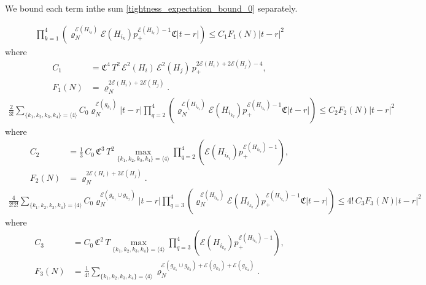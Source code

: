 \documentclass[11pt,reqno]{amsart}
\numberwithin{equation}{section}
\newcommand{\abs}[1]{\left\lvert #1 \right\rvert}
\newcommand{\sprod}[1]{\langle#1\rangle}
\begin{document}
{We bound  each term inthe sum \eqref{tightness_expectation_bound_0} separately. 


\begin{align}
    \prod_{k=1}^{4}\left(\varrho_N^{\mathcal{E}({H}_{i_k})}\mathcal{E}({H}_{i_k})p_+^{\mathcal{E}({H}_{i_k})-1}{\mathfrak{C}}\abs{t-r}\right)\leqslant C_1F_1(N)\abs{t-r}^2\label{CF_bound_1}
\end{align}
where
\begin{align*}
    C_1 &={\mathfrak{C}^4}\,T^2\,\mathcal{E}^2({H}_i)\,\mathcal{E}^{2}({H}_j)\,p_+^{2\mathcal{E}({H}_{i})+2\mathcal{E}({H}_j)-4},\\
    F_1(N) &=\varrho_N^{2\mathcal{E}({H_i})+2\mathcal{E}({H_j})}.
\end{align*}
\begin{align}
    \frac{2}{3!}\sum_{\{k_1,k_2,k_3,k_4\} = \sprod{4}} C_0\varrho_N^{\mathcal{E}(g_{k_1})}\abs{t-r}\prod_{q=2}^{4}\left(\varrho_N^{\mathcal{E}({H}_{i_{k_q}})}\mathcal{E}({H}_{i_{k_q}})p_+^{\mathcal{E}({H}_{i_{k_q}})-1}{\mathfrak{C}}\abs{t-r}\right) \leqslant C_2F_2(N)\abs{t-r}^2\label{CF_bound_2}
\end{align}
where
\begin{align*}
    C_2 &=\frac{1}{3}\,C_0\,{\mathfrak{C}^3}\,T^2\max_{\{k_1,k_2,k_3,k_4\} = \sprod{4}} \prod_{q=2}^{4}\left(\mathcal{E}({H}_{i_{k_q}})p_+^{\mathcal{E}({H}_{i_{k_q}})-1}\right),\\
    F_2(N) &=\varrho_N^{2\mathcal{E}({H_i})+2\mathcal{E}({H_j})}.
\end{align*}
\begin{align}
    \frac{4}{2!2!}\sum_{\{k_1,k_2,k_3,k_4\} = \sprod{4}} C_0\varrho_N^{\mathcal{E}(g_{k_1}\cup g_{k_2})}\abs{t-r}\prod_{q=3}^{4}\left(\varrho_N^{\mathcal{E}({H}_{i_{k_q}})}\mathcal{E}({H}_{i_{k_q}})p_+^{\mathcal{E}({H}_{i_{k_q}})-1}{\mathfrak{C}}\abs{t-r}\right)\leqslant 4!\,C_3F_3(N)\abs{t-r}^2\label{CF_bound_3}
\end{align}
where
\begin{align*}
    C_3 &= C_0\,{\mathfrak{C}^2}\,T\max_{\{k_1,k_2,k_3,k_4\} = \sprod{4}} \prod_{q=3}^{4}\left(\mathcal{E}({H}_{i_{k_q}})p_+^{\mathcal{E}({H}_{i_{k_q}})-1}\right),\\
    F_3(N) &=\frac{1}{4!}\sum_{\{k_1,k_2,k_3,k_4\}=\sprod{4}}\varrho_N^{\mathcal{E}(g_{k_1}\cup g_{k_2}) + \mathcal{E}(g_{k_3})+\mathcal{E}(g_{k_4})}.
\end{align*}
\begin{align}

\end{align}}
\end{document}
